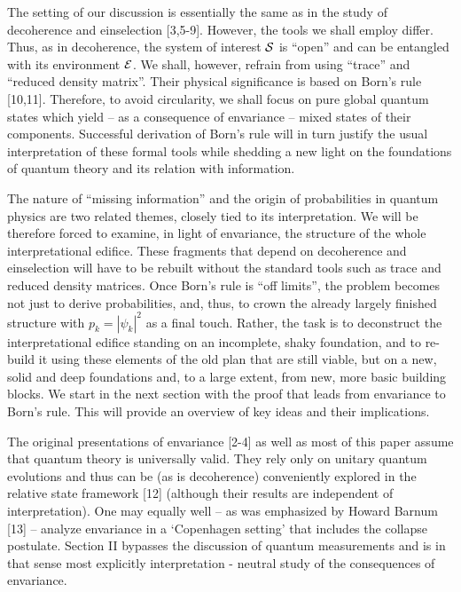 \documentclass[aps,twocolumn,pra,epsfig]{revtex4}
\begin{document}
The setting of our discussion is essentially the same as in the study of 
decoherence and einselection [3,5-9]. However, the tools we shall
employ differ. Thus, as in decoherence, the system of interest ${\cal S}$ 
is ``open'' and can be entangled with its environment ${\cal E}$. We shall, 
however, refrain from using ``trace'' and ``reduced density matrix''.  Their
physical significance is based on Born's rule [10,11]. Therefore, to avoid 
circularity, we shall focus on pure global quantum states which yield -- 
as a consequence of envariance -- mixed states of their components. 
Successful derivation of Born's rule will in turn justify the usual interpretation 
of these formal tools while shedding a new light on the foundations of 
quantum theory and its relation with information.

The nature of  ``missing information'' and the origin of probabilities in
quantum physics are two related themes, closely tied to its interpretation.
We will be therefore forced to examine, in light of envariance, the structure
of the whole interpretational edifice. These fragments that depend on 
decoherence and einselection will have to be rebuilt without the standard 
tools such as trace and reduced density matrices. Once Born's rule is
``off limits'', the problem becomes not just to derive probabilities, and,
thus, to crown the already largely finished structure with $p_k=|\psi_k|^2$
as a final touch. Rather, the task is to deconstruct the interpretational
edifice standing on an incomplete, shaky foundation, and to re-build it using
these elements of the old plan that are still viable, but on a new, solid and
deep foundations and, to a large extent, from new, more basic building blocks.
We start in the next section with the proof that leads from envariance to
Born's rule. This will provide an overview of key ideas and their implications.

The original presentations of envariance [2-4] as well as most of this paper 
assume that quantum theory is universally valid. They rely only on unitary 
quantum evolutions and thus can be (as is decoherence) conveniently explored 
in the relative state framework [12] (although their results are independent of
interpretation). One may equally well -- as was emphasized by Howard Barnum [13] 
-- analyze envariance in a `Copenhagen setting' that includes the collapse postulate. 
Section II bypasses the discussion of quantum measurements and is in that sense
most explicitly interpretation - neutral study of the consequences of envariance.
\end{document}
